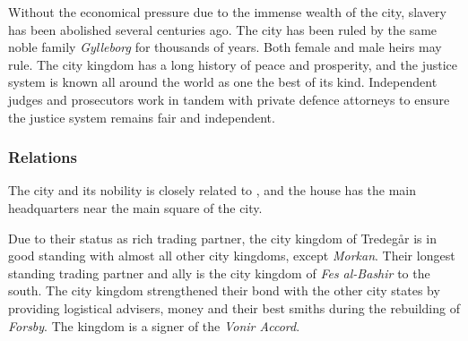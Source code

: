 Without the economical pressure due to the immense wealth of the city, slavery
has been abolished several centuries ago. The city has been ruled by the same
noble family \emph{Gylleborg} for thousands of years. Both female and male
heirs may rule. The city kingdom has a long history of peace and prosperity,
and the justice system is known all around the world as one the best of its
kind. Independent judges and prosecutors work in tandem with private defence
attorneys to ensure the justice system remains fair and independent.

\subsubsection{Relations}

The city and its nobility is closely related to ,
and the house has the main headquarters near the main square of the city.

Due to their status as rich trading partner, the city kingdom of Tredegår is
in good standing with almost all other city kingdoms, except \emph{Morkan}.
Their longest standing trading partner and ally is the city kingdom of
\emph{Fes al-Bashir} to the south. The city kingdom strengthened their bond
with the other city states by providing logistical advisers, money and
their best smiths during the rebuilding of \emph{Forsby}. The kingdom is a
signer of the \emph{Vonir Accord}.
